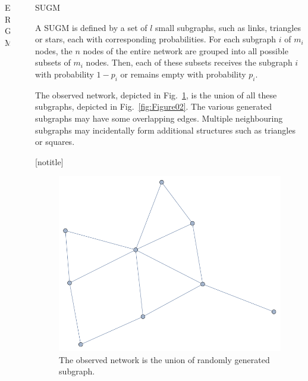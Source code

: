 \documentclass[final]{beamer}
\newlength{\sepwid}
\newlength{\onecolwid}
\newlength{\threecolwid}
\begin{document}
\begin{frame}[t]
\begin{columns}[t]
\begin{column}{\threecolwid}
\begin{columns}[t,totalwidth=\threecolwid]
\begin{column}{\onecolwid}
\begin{block}{ERGM}
\end{block}

\end{column} %

\begin{column}{\sepwid}\end{column} %

\begin{column}{\onecolwid}\vspace{-.6in} %

\begin{block}{SUGM}

A SUGM is defined by a set of $l$ small subgraphs, such as links, triangles or stars, each with corresponding probabilities. For each subgraph $i$ of $m_{i}$ nodes, the $n$ nodes of the entire network are grouped into all possible subsets of $m_{i}$ nodes. Then, each of these subsets receives the subgraph $i$ with probability $1-p_{i}$ or remains empty with probability $p_{i}$.

The observed network, depicted in Fig.~\ref{fig:Figure01}, is the union of all these subgraphs, depicted in Fig.~\ref{fig:Figure02}. The various generated subgraphs may have some overlapping edges. Multiple neighbouring subgraphs may incidentally form additional structures such as triangles or squares.

\end{block}

[notitle]
\begin{block}

\begin{figure}
\includegraphics[width=0.8\linewidth]{../Figure02_1.pdf}
\caption{\hspace{3mm}The observed network is the union of randomly generated subgraph.}
\label{fig:Figure01}
\end{figure}


\end{block}
\end{column}
\end{columns}
\end{column}
\end{columns}
\end{frame}
\end{document}
